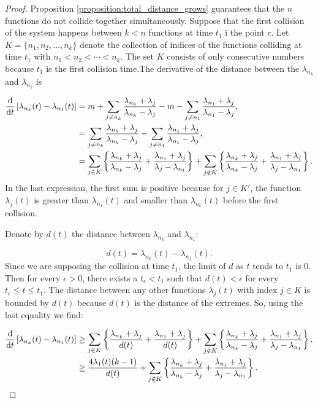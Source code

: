 \begin{proof}
    Proposition \ref{proposition:total_distance_grows} guarantees that the $n$ functions do not collide together simultaneously. Suppose that the first collision of the system happens between $k < n$ functions at time $t_1$ i the point $c$. Let $K = \{ n_1, n_2, \dots, n_k\}$ denote the collection of indices of the functions colliding at time $t_1$ with $n_1 < n_2 <\cdots < n_k$. The set $K$ consists of only consecutive numbers because $t_1$ is the first collision time.The derivative of the distance between the $\lambda_{n_k}$ and $\lambda_{n_1}$ is

    \begin{align*}
        \frac{\mathrm d }{\mathrm d t} \left[ \lambda_{n_k}(t) - \lambda_{n_1}(t) \right] &= m + \sum_{j\neq n_k} \frac{\lambda_{n_k} + \lambda_j}{\lambda_{n_k} - \lambda_j} - m - \sum_{j\neq n_1} \frac{\lambda_{n_1} + \lambda_j}{\lambda_{n_1} - \lambda_j},\\
        &= \sum_{j\neq n_k} \frac{\lambda_{n_k} + \lambda_j}{\lambda_{n_k} - \lambda_j} - \sum_{j\neq n_1} \frac{\lambda_{n_1} + \lambda_j}{\lambda_{n_1} - \lambda_j},\\
        &= \sum_{j \in K} \left\{ \frac{\lambda_{n_k} + \lambda_j}{\lambda_{n_k} - \lambda_j } + \frac{\lambda_{n_1} + \lambda_j}{\lambda_j - \lambda_{n_1} } \right\} + \sum_{j \notin K} \left\{ \frac{\lambda_{n_k} + \lambda_j}{\lambda_{n_k} - \lambda_j } + \frac{\lambda_{n_1} + \lambda_j}{\lambda_j - \lambda_{n_1} } \right\}.
    \end{align*}
    In the last expression, the first sum is positive because for $j\in K'$, the function $\lambda_j(t)$ is greater than $\lambda_{n_1}(t)$ and smaller than $\lambda_{n_k}(t)$ before the first collision. 
    
    Denote by $d(t)$ the distance between $\lambda_{n_k}$ and $\lambda_{n_1}$:

    \[ d(t) = \lambda_{n_k}(t) - \lambda_{n_1}(t). \]
    Since we are supposing the collision at time $t_1$, the limit of $d$ as $t$ tends to $t_1$ is 0. Then for every $\epsilon >0$, there exists a $t_\epsilon<t_1$ such that $d(t) < \epsilon$ for every $t_\epsilon \le t\le t_1$. The distance between any other functions $\lambda_j(t)$ with index $j\in K$ is bounded by $d(t)$ because $d(t)$ is the distance of the extremes. So, using the last equality we find:

    \begin{align*}
        \frac{\mathrm d }{\mathrm d t} \left[ \lambda_{n_k}(t) - \lambda_{n_1}(t) \right] &\ge \sum_{j \in K} \left\{ \frac{\lambda_{n_k} + \lambda_j}{d(t)} + \frac{\lambda_{n_1} + \lambda_j}{d(t)} \right\} + \sum_{j \notin K} \left\{ \frac{\lambda_{n_k} + \lambda_j}{\lambda_{n_k} - \lambda_j } + \frac{\lambda_{n_1} + \lambda_j}{\lambda_j - \lambda_{n_1} } \right\},
        \\ &\ge\frac{4\lambda_1(t)(k-1)}{d(t)} + \sum_{j \notin K} \left\{ \frac{\lambda_{n_k} + \lambda_j}{\lambda_{n_k} - \lambda_j } + \frac{\lambda_{n_1} + \lambda_j}{\lambda_j - \lambda_{n_1} } \right\}.
    \end{align*}


\end{proof}
